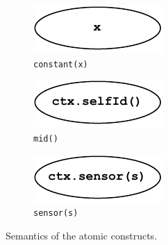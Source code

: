 \begin{figure}
    \centering
    \begin{subfigure}[b]{0.3\textwidth}
        \centering
        \includegraphics[width=\textwidth]{figures/semantics/constant.pdf}
        \caption{\texttt{constant(x)}}
        \label{fig:semantics-constant}
    \end{subfigure}
    \hfill
    \begin{subfigure}[b]{0.3\textwidth}
        \centering
        \includegraphics[width=\textwidth]{figures/semantics/mid.pdf}
        \caption{\texttt{mid()}}
        \label{fig:semantics-mid}
    \end{subfigure}
    \hfill
    \begin{subfigure}[b]{0.3\textwidth}
        \centering
        \includegraphics[width=\textwidth]{figures/semantics/sensor.pdf}
        \caption{\texttt{sensor(s)}}
        \label{fig:semantics-sensor}
    \end{subfigure}
    \caption{Semantics of the atomic constructs.}
    \label{fig:semantics-local-atomic}
\end{figure}

